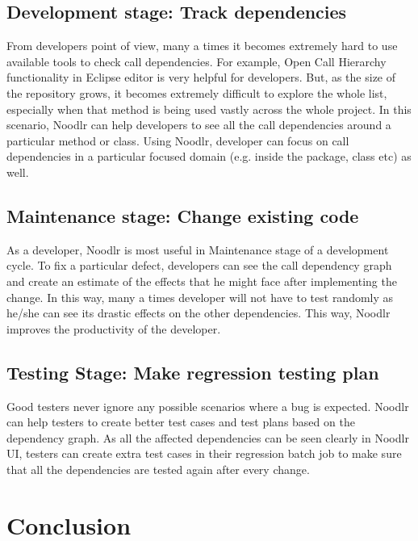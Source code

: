\subsection{Development stage: Track dependencies}
From developers point of view, many a times it becomes extremely hard to use available tools to check call dependencies. For example, Open Call Hierarchy functionality in Eclipse editor is very helpful for developers. But, as the size of the repository grows, it becomes extremely difficult to explore the whole list, especially when that method is being used vastly across the whole project. In this scenario, Noodlr can help developers to see all the call dependencies around a particular method or class. Using Noodlr, developer can focus on call dependencies in a particular focused domain (e.g. inside the package, class etc) as well.
\subsection{Maintenance stage: Change existing code}
As a developer, Noodlr is most useful in Maintenance stage of a development cycle. To fix a particular defect, developers can see the call dependency graph and create an estimate of the effects that he might face after implementing the change. In this way, many a times developer will not have to test randomly as he/she can see its drastic effects on the other dependencies. This way, Noodlr improves the productivity of the developer.
\subsection{Testing Stage: Make regression testing plan}
Good testers never ignore any possible scenarios where a bug is expected. Noodlr can help testers to create better test cases and test plans based on the dependency graph. As all the affected dependencies can be seen clearly in Noodlr UI, testers can create extra test cases in their regression batch job to make sure that all the dependencies are tested again after every change.

\section{Conclusion}
\label{sec:conclusion}


